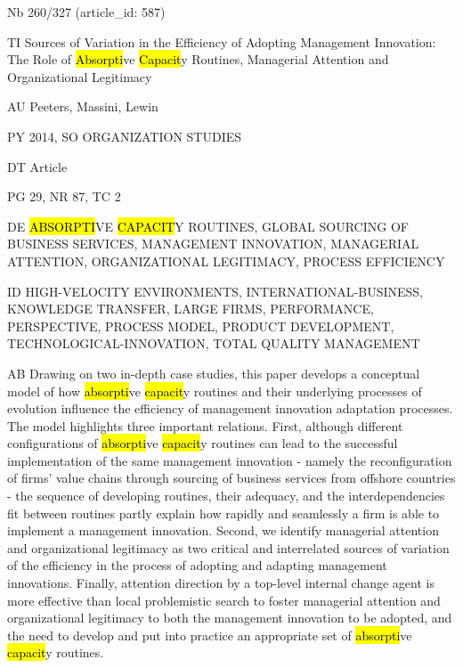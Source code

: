 \documentclass[a4paper]{article}
\begin{document}
\vspace*{-2cm}
Nb \tabto{0cm}260/327 (article\_id: 587)\par
TI \tabto{0cm}Sources of Variation in the Efficiency of Adopting Management Innovation: The Role of \hl{Absorpti}ve \hl{Capacit}y Routines, Managerial Attention and Organizational Legitimacy\par
AU \tabto{0cm}Peeters, Massini, Lewin\par
PY \tabto{0cm}2014, SO ORGANIZATION STUDIES\par
DT \tabto{0cm}Article\par
PG \tabto{0cm}29, NR 87, TC 2\par
DE \tabto{0cm}\hl{ABSORPTI}VE \hl{CAPACIT}Y ROUTINES, GLOBAL SOURCING OF BUSINESS SERVICES, MANAGEMENT INNOVATION, MANAGERIAL ATTENTION, ORGANIZATIONAL LEGITIMACY, PROCESS EFFICIENCY\par
ID \tabto{0cm}HIGH-VELOCITY ENVIRONMENTS, INTERNATIONAL-BUSINESS, KNOWLEDGE TRANSFER, LARGE FIRMS, PERFORMANCE, PERSPECTIVE, PROCESS MODEL, PRODUCT DEVELOPMENT, TECHNOLOGICAL-INNOVATION, TOTAL QUALITY MANAGEMENT\par
AB \tabto{0cm}Drawing on two in-depth case studies, this paper develops a conceptual model of how \hl{absorpti}ve \hl{capacit}y routines and their underlying processes of evolution influence the efficiency of management innovation adaptation processes. The model highlights three important relations. First, although different configurations of \hl{absorpti}ve \hl{capacit}y routines can lead to the successful implementation of the same management innovation - namely the reconfiguration of firms' value chains through sourcing of business services from offshore countries - the sequence of developing routines, their adequacy, and the interdependencies fit between routines partly explain how rapidly and seamlessly a firm is able to implement a management innovation. Second, we identify managerial attention and organizational legitimacy as two critical and interrelated sources of variation of the efficiency in the process of adopting and adapting management innovations. Finally, attention direction by a top-level internal change agent is more effective than local problemistic search to foster managerial attention and organizational legitimacy to both the management innovation to be adopted, and the need to develop and put into practice an appropriate set of \hl{absorpti}ve \hl{capacit}y routines.\par
\clearpage
\end{document}
